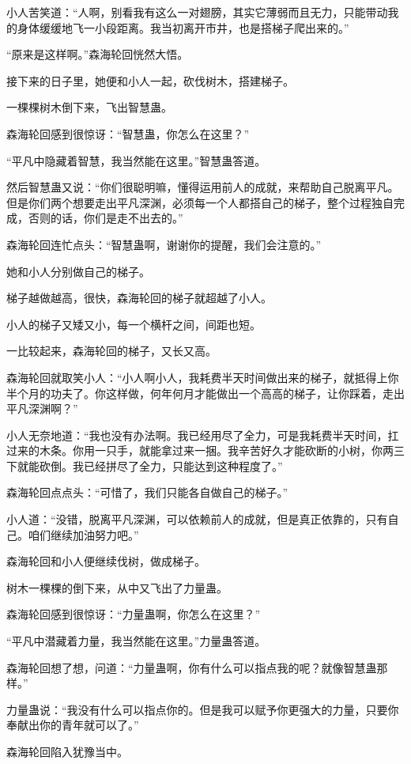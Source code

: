 \begin{this_body}
小人苦笑道：“人啊，别看我有这么一对翅膀，其实它薄弱而且无力，只能带动我的身体缓缓地飞一小段距离。我当初离开市井，也是搭梯子爬出来的。”

“原来是这样啊。”森海轮回恍然大悟。

接下来的日子里，她便和小人一起，砍伐树木，搭建梯子。

一棵棵树木倒下来，飞出智慧蛊。

森海轮回感到很惊讶：“智慧蛊，你怎么在这里？”

“平凡中隐藏着智慧，我当然能在这里。”智慧蛊答道。

然后智慧蛊又说：“你们很聪明嘛，懂得运用前人的成就，来帮助自己脱离平凡。但是你们两个想要走出平凡深渊，必须每一个人都搭自己的梯子，整个过程独自完成，否则的话，你们是走不出去的。”

森海轮回连忙点头：“智慧蛊啊，谢谢你的提醒，我们会注意的。”

她和小人分别做自己的梯子。

梯子越做越高，很快，森海轮回的梯子就超越了小人。

小人的梯子又矮又小，每一个横杆之间，间距也短。

一比较起来，森海轮回的梯子，又长又高。

森海轮回就取笑小人：“小人啊小人，我耗费半天时间做出来的梯子，就抵得上你半个月的功夫了。你这样做，何年何月才能做出一个高高的梯子，让你踩着，走出平凡深渊啊？”

小人无奈地道：“我也没有办法啊。我已经用尽了全力，可是我耗费半天时间，扛过来的木条。你用一只手，就能拿过来一捆。我辛苦好久才能砍断的小树，你两三下就能砍倒。我已经拼尽了全力，只能达到这种程度了。”

森海轮回点点头：“可惜了，我们只能各自做自己的梯子。”

小人道：“没错，脱离平凡深渊，可以依赖前人的成就，但是真正依靠的，只有自己。咱们继续加油努力吧。”

森海轮回和小人便继续伐树，做成梯子。

树木一棵棵的倒下来，从中又飞出了力量蛊。

森海轮回感到很惊讶：“力量蛊啊，你怎么在这里？”

“平凡中潜藏着力量，我当然能在这里。”力量蛊答道。

森海轮回想了想，问道：“力量蛊啊，你有什么可以指点我的呢？就像智慧蛊那样。”

力量蛊说：“我没有什么可以指点你的。但是我可以赋予你更强大的力量，只要你奉献出你的青年就可以了。”

森海轮回陷入犹豫当中。


\end{this_body}
